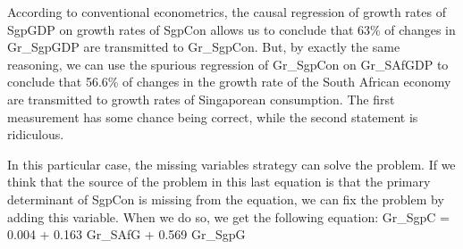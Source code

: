 \documentclass[
  letterpaper,
  DIV=11,
  numbers=noendperiod]{scrartcl}
\begin{document}
According to conventional econometrics, the causal regression of growth
rates of SgpGDP on growth rates of SgpCon allows us to conclude that
63\% of changes in Gr\_SgpGDP are transmitted to Gr\_SgpCon. But, by
exactly the same reasoning, we can use the spurious regression of
Gr\_SgpCon on Gr\_SAfGDP to conclude that 56.6\% of changes in the
growth rate of the South African economy are transmitted to growth rates
of Singaporean consumption. The first measurement has some chance being
correct, while the second statement is ridiculous.

In this particular case, the missing variables strategy can solve the
problem. If we think that the source of the problem in this last
equation is that the primary determinant of SgpCon is missing from the
equation, we can fix the problem by adding this variable. When we do so,
we get the following equation: Gr\_SgpC = 0.004 + 0.163 Gr\_SAfG + 0.569
Gr\_SgpG

 
  \providecommand{\huxb}[2]{\arrayrulecolor[RGB]{#1}\global\arrayrulewidth=#2pt}
  \providecommand{\huxvb}[2]{\color[RGB]{#1}\vrule width #2pt}
  \providecommand{\huxtpad}[1]{\rule{0pt}{#1}}
  \providecommand{\huxbpad}[1]{\rule[-#1]{0pt}{#1}}
\end{document}
